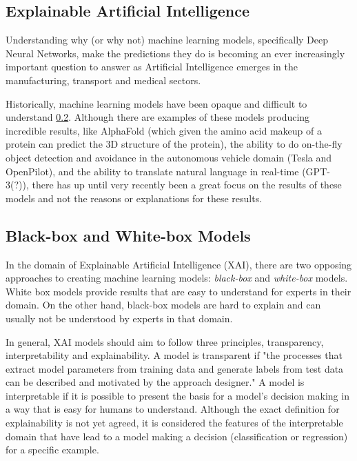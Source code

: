 \documentclass{article}
\begin{document}
\subsection{Explainable Artificial Intelligence}

Understanding why (or why not) machine learning models, specifically Deep Neural Networks, make the predictions they do is becoming an ever increasingly important question to answer as Artificial Intelligence emerges in the manufacturing, transport and medical sectors.

Historically, machine learning models have been opaque and difficult to understand \ref{}. Although there are examples of these models producing incredible results, like AlphaFold (which given the amino acid makeup of a protein can predict the 3D structure of the protein), the ability to do on-the-fly object detection and avoidance in the autonomous vehicle domain (Tesla and OpenPilot), and the ability to translate natural language in real-time (GPT-3(?)), there has up until very recently been a great focus on the results of these models and not the reasons or explanations for these results. 

\subsection{Black-box and White-box Models}

In the domain of Explainable Artificial Intelligence (XAI), there are two opposing approaches to creating machine learning models: \textit{black-box} and \textit{white-box} models. White box models provide results that are easy to understand for experts in their domain. On the other hand, black-box models are hard to explain and can usually not be understood by experts in that domain. 

In general, XAI models should aim to follow three principles, transparency, interpretability and explainability. A model is transparent if "the processes that extract model parameters from training data and generate labels from test data can be described and motivated by the approach designer." A model is interpretable if it is possible to present the basis for a model's decision making in a way that is easy for humans to understand. Although the exact definition for explainability is not yet agreed, it is considered the features of the interpretable domain that have lead to a model making a decision (classification or regression) for a specific example. 
\end{document}
